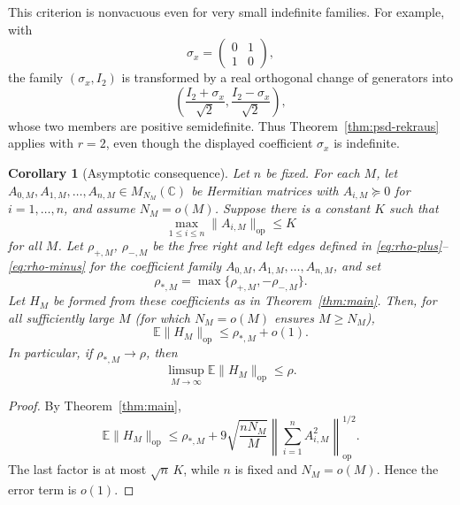 \documentclass{article}
\newtheorem{corollary}[theorem]{Corollary}
\newcommand{\C}{\mathbb C}
\newcommand{\E}{\mathbb E}
\newcommand{\op}{\mathrm{op}}
\begin{document}
This criterion is nonvacuous even for very small indefinite families.  For
example, with
\[
	\sigma_x=\begin{pmatrix}0&1\\1&0\end{pmatrix},
\]
the family \((\sigma_x,I_2)\) is transformed by a real orthogonal change of
generators into
\[
	\left(\frac{I_2+\sigma_x}{\sqrt2},
	\frac{I_2-\sigma_x}{\sqrt2}\right),
\]
whose two members are positive semidefinite.  Thus
Theorem~\ref{thm:psd-rekraus} applies with \(r=2\), even though the displayed
coefficient \(\sigma_x\) is indefinite.

\begin{corollary}[Asymptotic consequence]
	\label{cor:asymptotic}
	Let \(n\) be fixed.  For each \(M\), let
	\(A_{0,M},A_{1,M},\ldots,A_{n,M}\in M_{N_M}(\C)\) be Hermitian matrices with
	\(A_{i,M}\succeq0\) for \(i=1,\ldots,n\), and assume \(N_M=o(M)\).  Suppose
	there is a constant \(K\) such that
	\[
		\max_{1\le i\le n}\|A_{i,M}\|_{\op}\le K
	\]
	for all \(M\).  Let \(\rho_{+,M}\), \(\rho_{-,M}\) be the free right and left
	edges defined in \eqref{eq:rho-plus}--\eqref{eq:rho-minus} for the coefficient
	family \(A_{0,M},A_{1,M},\ldots,A_{n,M}\), and set
	\[
		\rho_{*,M}=\max\{\rho_{+,M},-\rho_{-,M}\}.
	\]
	Let \(H_M\) be formed from these coefficients as in Theorem~\ref{thm:main}.
	Then, for all sufficiently large \(M\) (for which \(N_M=o(M)\) ensures
	\(M\ge N_M\)),
	\[
		\E\|H_M\|_{\op}\le \rho_{*,M}+o(1).
	\]
	In particular, if \(\rho_{*,M}\to\rho\), then
	\[
		\limsup_{M\to\infty}\E\|H_M\|_{\op}\le\rho .
	\]
\end{corollary}

\begin{proof}
	By Theorem~\ref{thm:main},
	\[
		\E\|H_M\|_{\op}
		\le
		\rho_{*,M}
		+
		9\sqrt{\frac{nN_M}{M}}
		\left\|\sum_{i=1}^n A_{i,M}^2\right\|_{\op}^{1/2}.
	\]
	The last factor is at most \(\sqrt n\,K\), while \(n\) is fixed and
	\(N_M=o(M)\).  Hence the error term is \(o(1)\).
\end{proof}
\end{document}
